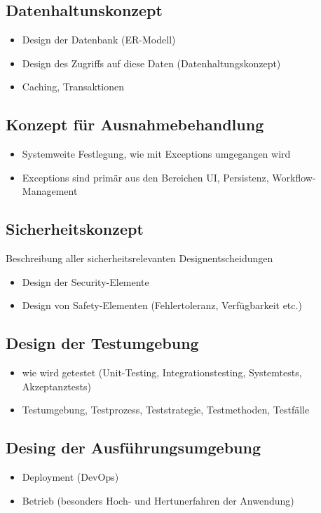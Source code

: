 \subsection{Datenhaltunskonzept}
\begin{itemize}
	\item Design der Datenbank (ER-Modell)
	\item Design des Zugriffs auf diese Daten (Datenhaltungskonzept)
	\item Caching, Transaktionen
\end{itemize}

\subsection{Konzept für Ausnahmebehandlung}
\begin{itemize}
	\item Systemweite Festlegung, wie mit Exceptions umgegangen wird
	\item Exceptions sind primär aus den Bereichen UI, Persistenz, Workflow-Management
\end{itemize}

\subsection{Sicherheitskonzept}
Beschreibung aller sicherheitsrelevanten Designentscheidungen

\begin{itemize}
	\item Design der Security-Elemente
	\item Design von Safety-Elementen (Fehlertoleranz, Verfügbarkeit etc.)
\end{itemize}

\subsection{Design der Testumgebung}
\begin{itemize}
	\item wie wird getestet (Unit-Testing, Integrationstesting, Systemtests, Akzeptanztests)
	\item Testumgebung, Testprozess, Teststrategie, Testmethoden, Testfälle
\end{itemize}


\subsection{Desing der Ausführungsumgebung}
\begin{itemize}
	\item Deployment (DevOps)
	\item Betrieb (besonders Hoch- und Hertunerfahren der Anwendung)
\end{itemize}

